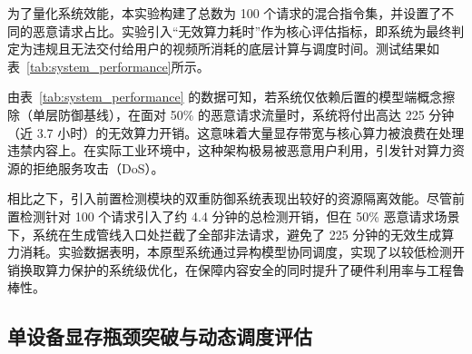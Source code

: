 为了量化系统效能，本实验构建了总数为 100 个请求的混合指令集，并设置了不同的恶意请求占比。实验引入“无效算力耗时”作为核心评估指标，即系统为最终判定为违规且无法交付给用户的视频所消耗的底层计算与调度时间。测试结果如表~\ref{tab:system_performance}所示。

\begin{table}[htbp]
    \centering
    \label{tab:system_performance}
\end{table}

由表~\ref{tab:system_performance} 的数据可知，若系统仅依赖后置的模型端概念擦除（单层防御基线），在面对 50\% 的恶意请求流量时，系统将付出高达 225 分钟（近 3.7 小时）的无效算力开销。这意味着大量显存带宽与核心算力被浪费在处理违禁内容上。在实际工业环境中，这种架构极易被恶意用户利用，引发针对算力资源的拒绝服务攻击（DoS）。

相比之下，引入前置检测模块的双重防御系统表现出较好的资源隔离效能。尽管前置检测针对 100 个请求引入了约 4.4 分钟的总检测开销，但在 50\% 恶意请求场景下，系统在生成管线入口处拦截了全部非法请求，避免了 225 分钟的无效生成算力消耗。实验数据表明，本原型系统通过异构模型协同调度，实现了以较低检测开销换取算力保护的系统级优化，在保障内容安全的同时提升了硬件利用率与工程鲁棒性。

\subsection{单设备显存瓶颈突破与动态调度评估}


